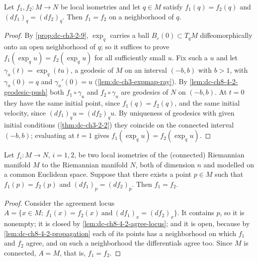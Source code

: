 \begin{lemma}
  \label{lem:dc-ch8-4-2-propagation}


  Let $f_1,f_2:M\to N$ be local isometries and let $q\in M$ satisfy $f_1(q)=f_2(q)$ and
  $(df_1)_q=(df_2)_q$. Then $f_1=f_2$ on a neighborhood of $q$.
\end{lemma}
\begin{proof}

\sketch
  By \cref{prop:dc-ch3-2-9}, $\exp_q$ carries a ball $B_\varepsilon(0)\subset T_qM$
  diffeomorphically onto an open neighborhood of $q$; so it suffices to prove
  $f_1(\exp_q u)=f_2(\exp_q u)$ for all sufficiently small $u$. Fix such a $u$ and let
  $\gamma_u(t)=\exp_q(tu)$, a geodesic of $M$ on an interval $(-b,b)$ with $b>1$, with
  $\gamma_u(0)=q$ and $\gamma_u'(0)=u$ (\cref{lem:dc-ch3-expmap-ray}). By
  \cref{lem:dc-ch8-4-2-geodesic-push} both $f_1\circ\gamma_u$ and $f_2\circ\gamma_u$ are
  geodesics of $N$ on $(-b,b)$. At $t=0$ they have the same initial point, since
  $f_1(q)=f_2(q)$, and the same initial velocity, since
  $(df_1)_q u=(df_2)_q u$. By uniqueness of geodesics with given initial conditions
  (\cref{thm:dc-ch3-2-2}) they coincide on the connected interval $(-b,b)$; evaluating
  at $t=1$ gives $f_1(\exp_q u)=f_2(\exp_q u)$.
\end{proof}

\begin{lemma}
  \label{lem:dc-ch8-4-2}


  Let $f_i:M\to N$, $i=1,2$, be two local isometries of the (connected) Riemannian
  manifold $M$ to the Riemannian manifold $N$, both of dimension $n$ and modelled on a
  common Euclidean space. Suppose that there exists a point $p\in M$ such that
  $f_1(p)=f_2(p)$ and $(df_1)_p=(df_2)_p$. Then $f_1=f_2$.
\end{lemma}
\begin{proof}

\sketch
  Consider the agreement locus
  $A=\{x\in M;\ f_1(x)=f_2(x)\ \text{and}\ (df_1)_x=(df_2)_x\}$. It contains $p$, so it
  is nonempty; it is closed by \cref{lem:dc-ch8-4-2-agree-locus}; and it is open,
  because by \cref{lem:dc-ch8-4-2-propagation} each of its points has a neighborhood on
  which $f_1$ and $f_2$ agree, and on such a neighborhood the differentials agree too.
  Since $M$ is connected, $A=M$, that is, $f_1=f_2$.
\end{proof}

